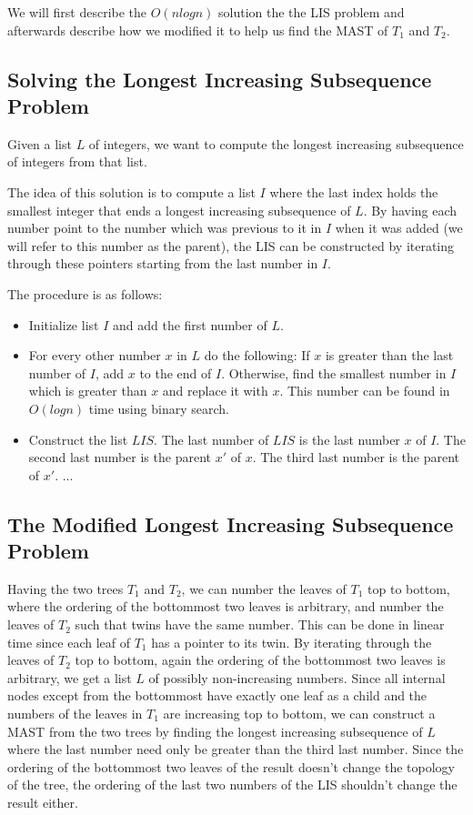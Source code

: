 We will first describe the $O(nlogn)$ solution the the LIS problem and afterwards describe how we modified it to help us find the MAST of $T_1$ and $T_2$.

\subsection{Solving the Longest Increasing Subsequence Problem}
Given a list $L$ of integers, we want to compute the longest increasing subsequence of integers from that list.


The idea of this solution is to compute a list $I$ where the last index holds the smallest integer that ends a longest increasing subsequence of $L$. By having each number point to the number which was previous to it in $I$ when it was added (we will refer to this number as the parent), the LIS can be constructed by iterating through these pointers starting from the last number in $I$.

The procedure is as follows:

\begin{itemize}
	\item Initialize list $I$ and add the first number of $L$.
	\item For every other number $x$ in $L$ do the following:
	\subitem If $x$ is greater than the last number of $I$, add $x$ to the end of $I$.
	\subitem Otherwise, find the smallest number in $I$ which is greater than $x$ and replace it with $x$. This number can be found in $O(logn)$ time using binary search.
	\item Construct the list $LIS$.
	\subitem The last number of $LIS$ is the last number $x$ of $I$.
	\subitem The second last number is the parent $x'$ of $x$.
	\subitem The third last number is the parent of $x'$.
	\subitem ...
\end{itemize}

\subsection{The Modified Longest Increasing Subsequence Problem}
Having the two trees $T_1$ and $T_2$, we can number the leaves of $T_1$ top to bottom, where the ordering of the bottommost two leaves is arbitrary, and number the leaves of $T_2$ such that twins have the same number. This can be done in linear time since each leaf of $T_1$ has a pointer to its twin. By iterating through the leaves of $T_2$ top to bottom, again the ordering of the bottommost two leaves is arbitrary, we get a list $L$ of possibly non-increasing numbers. Since all internal nodes except from the bottommost have exactly one leaf as a child and the numbers of the leaves in $T_1$ are increasing top to bottom, we can construct a MAST from the two trees by finding the longest increasing subsequence of $L$ where the last number need only be greater than the third last number. Since the ordering of the bottommost two leaves of the result doesn't change the topology of the tree, the ordering of the last two numbers of the LIS shouldn't change the result either.

